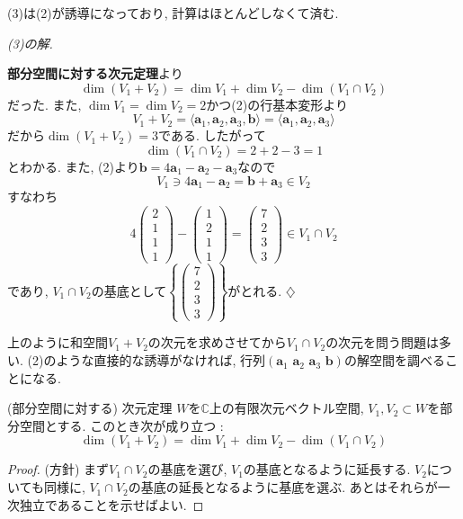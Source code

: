 \documentclass[titlepage]{jsarticle}
\numberwithin{equation}{section}
\newcommand{\C}{\mathbb{C}}%
\newenvironment{kaitou}[1][解]{%
\begin{proofbox}%
\textit{#1. }\ignorespaces
}{%
\hfill$\diamondsuit$%
\end{proofbox}%
}
\begin{document}
(3)は(2)が誘導になっており, 計算はほとんどしなくて済む.
\begin{kaitou}[(3)の解]
\textbf{部分空間に対する次元定理}より
\[
\dim{(V_1 + V_2)} = \dim V_1 + \dim V_2 - \dim (V_1 \cap V_2)
\]
だった. また, $\dim V_1 = \dim V_2 = 2$かつ(2)の行基本変形より
\[
V_1 + V_2 = \langle \bm{a}_1, \bm{a}_2, \bm{a}_3, \bm{b} \rangle = \langle \bm{a}_1, \bm{a}_2, \bm{a}_3 \rangle
\]
だから$\dim(V_1 + V_2) = 3$である. したがって
\[
\dim (V_1 \cap V_2) = 2 + 2 - 3 = \boxed{1}
\]
とわかる. また, (2)より$\bm{b} = 4\bm{a}_1-\bm{a}_2-\bm{a}_3$なので
\[
V_1 \ni 4\bm{a}_1 - \bm{a}_2 = \bm{b} + \bm{a}_3 \in V_2
\]
すなわち
\[
4
\begin{pmatrix}
2\\
1\\
1\\
1
\end{pmatrix}
-
\begin{pmatrix}
1\\
2\\
1\\
1
\end{pmatrix}
=
\begin{pmatrix}
7\\
2\\
3\\
3
\end{pmatrix}
\in V_1 \cap V_2
\]
であり, $V_1 \cap V_2$の基底として$\boxed{
\left\{
\begin{pmatrix}
7\\
2\\
3\\
3
\end{pmatrix}
\right\}
}$がとれる.
\end{kaitou}
上のように和空間$V_1 + V_2$の次元を求めさせてから$V_1 \cap V_2$の次元を問う問題は多い. (2)のような直接的な誘導がなければ, 行列$(\bm{a}_1\,\,\bm{a}_2\,\,\bm{a}_3\,\,\bm{b})$の解空間を調べることになる.  
\begin{thm}{(部分空間に対する) 次元定理}{}
$W$を$\C$上の有限次元ベクトル空間, $V_1, V_2 \subset W$を部分空間とする. このとき次が成り立つ : 
\[
\dim(V_1 + V_2) = \dim V_1 + \dim V_2 - \dim\left(V_1 \cap V_2\right)
\]
\end{thm}
\begin{proof}
(方針) まず$V_1 \cap V_2$の基底を選び, $V_1$の基底となるように延長する. $V_2$についても同様に, $V_1 \cap V_2$の基底の延長となるように基底を選ぶ. あとはそれらが一次独立であることを示せばよい.
\end{proof}
\end{document}
